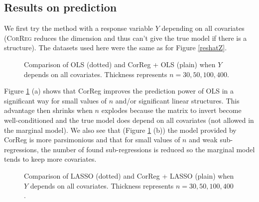 \documentclass[11pt,a4paper]{article}
\begin{document}
\FloatBarrier
\subsection{Results on prediction}\label{reshatY}

We first try the method with a response variable $Y$ depending on all covariates (\textsc{CorReg} reduces the dimension and thus can't give the true model if there is a structure). The datasets used here were the same as for Figure \ref{reshatZ}. 
 
\begin{figure}[h!]
	 \quad
	\caption{Comparison of OLS (dotted) and CorReg + OLS (plain) when $Y$ depends on all covariates. Thickness represents $n=30,50,100,400$.}\label{toutOLS}
\end{figure}

 Figure \ref{toutOLS} (a) shows that CorReg improves the prediction power of OLS in a significant way for small values of $n$ and/or significant linear structures. This advantage then shrinks when $n$ explodes because the matrix to invert become well-conditioned and the true model does depend on all covariates (not allowed in the marginal model). We also see that (Figure \ref{toutOLS} (b)) the model provided by CorReg is more parsimonious and that for small values of $n$ and weak sub-regressions, the number of found sub-regressions is reduced so the marginal model tends to keep more covariates.

\begin{figure}[h!]
	 \quad
	\caption{Comparison of LASSO (dotted) and CorReg + LASSO (plain) when $Y$ depends on all covariates. Thickness represents $n=30,50,100,400$.}\label{toutlar}
\end{figure}
\end{document}
